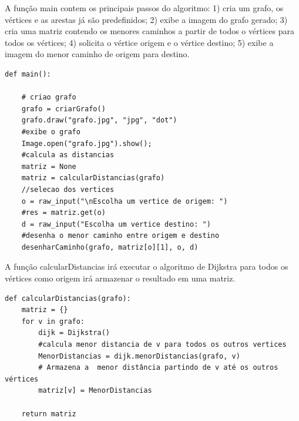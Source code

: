 \documentclass[a4paper,12pt]{article}
\begin{document}
A função main contem os principais passos do algoritmo: 1) cria um grafo, os vértices e as arestas já são predefinidos; 2) exibe a imagem do grafo gerado; 3) cria uma matriz contendo os menores caminhos a partir de todos o vértices para todos os vértices; 4) solicita o vértice  origem e o vértice destino; 5) exibe a imagem do menor caminho de origem para destino.
\begin{lstlisting}
def main():

	# criao grafo
	grafo = criarGrafo() 
	grafo.draw("grafo.jpg", "jpg", "dot")
	#exibe o grafo
	Image.open("grafo.jpg").show();
	#calcula as distancias
	matriz = None
	matriz = calcularDistancias(grafo)
	//selecao dos vertices
	o = raw_input("\nEscolha um vertice de origem: ")
	#res = matriz.get(o)
	d = raw_input("Escolha um vertice destino: ")
	#desenha o menor caminho entre origem e destino
	desenharCaminho(grafo, matriz[o][1], o, d)
\end{lstlisting}
A função calcularDistancias irá executar o algoritmo de Dijkstra para todos os vértices como origem irá armazenar o resultado em uma matriz.
\begin{lstlisting}
def calcularDistancias(grafo):
	matriz = {}
	for v in grafo:
		dijk = Dijkstra()
		#calcula menor distancia de v para todos os outros vertices
		MenorDistancias = dijk.menorDistancias(grafo, v)
		# Armazena a  menor distância partindo de v até os outros vértices
		matriz[v] = MenorDistancias

	return matriz
\end{lstlisting}
\end{document}
